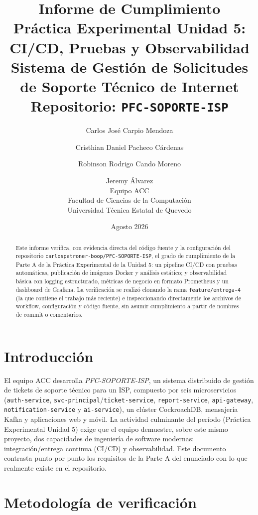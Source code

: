 \documentclass[11pt,letterpaper]{article}
\title{\textbf{Informe de Cumplimiento}\\
\large Práctica Experimental Unidad 5: CI/CD, Pruebas y Observabilidad\\
\large Sistema de Gestión de Solicitudes de Soporte Técnico de Internet\\
\large Repositorio: \texttt{PFC-SOPORTE-ISP}}
\author{
Carlos José Carpio Mendoza \and
Cristhian Daniel Pacheco Cárdenas \and
Robinson Rodrigo Cando Moreno \and
Jeremy Álvarez\\[1em]
\normalsize Equipo ACC\\
\normalsize Facultad de Ciencias de la Computación\\
\normalsize Universidad Técnica Estatal de Quevedo
}
\date{Agosto 2026}
\begin{document}
\maketitle
\thispagestyle{empty}

\begin{abstract}
\noindent Este informe verifica, con evidencia directa del código fuente y la configuración del repositorio \texttt{carlospatroner-boop/PFC-SOPORTE-ISP}, el grado de cumplimiento de la Parte A de la Práctica Experimental de la Unidad 5: un pipeline CI/CD con pruebas automáticas, publicación de imágenes Docker y análisis estático; y observabilidad básica con logging estructurado, métricas de negocio en formato Prometheus y un dashboard de Grafana. La verificación se realizó clonando la rama \texttt{feature/entrega-4} (la que contiene el trabajo más reciente) e inspeccionando directamente los archivos de workflow, configuración y código fuente, sin asumir cumplimiento a partir de nombres de commit o comentarios.
\end{abstract}

\section{Introducción}

El equipo ACC desarrolla \emph{PFC-SOPORTE-ISP}, un sistema distribuido de gestión de tickets de soporte técnico para un ISP, compuesto por seis microservicios (\texttt{auth-service}, \texttt{svc-principal}/\texttt{ticket-service}, \texttt{report-service}, \texttt{api-gateway}, \texttt{notification-service} y \texttt{ai-service}), un clúster CockroachDB, mensajería Kafka y aplicaciones web y móvil. La actividad culminante del período (Práctica Experimental Unidad 5) exige que el equipo demuestre, sobre este mismo proyecto, dos capacidades de ingeniería de software modernas: integración/entrega continua (CI/CD) y observabilidad. Este documento contrasta punto por punto los requisitos de la Parte A del enunciado con lo que realmente existe en el repositorio.

\section{Metodología de verificación}
\end{document}
